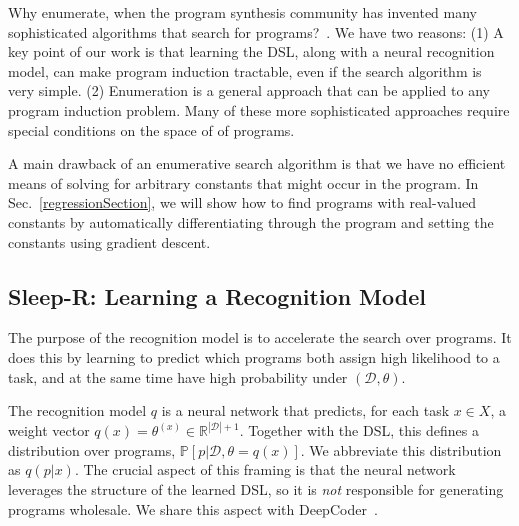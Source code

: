 \documentclass{article}
\newcommand{\probability}{\mathds{P}} %
\begin{document}
Why enumerate, when the program synthesis community has invented many
sophisticated algorithms that search for programs?~\cite{solar2008program,schkufza2013stochastic,feser2015synthesizing,osera2015type,polozov2015flashmeta}.
We have two reasons:
(1) A key point of our work is that learning the DSL, along with a neural recognition model, can make program induction tractable, even if the search algorithm is very simple.
(2) Enumeration is a general approach that can be applied to any program induction problem. Many of these more sophisticated approaches require special conditions on
  the space of of programs.

A main drawback of an enumerative search algorithm is that we have no
efficient means of solving for arbitrary constants that might occur in the
program. In Sec.~\ref{regressionSection},
we will show how to find programs with real-valued constants
by automatically differentiating through the program and setting the constants using gradient descent.







\subsection{Sleep-R: Learning a Recognition Model}\label{recognitionSection}

The purpose of the recognition model is to accelerate the search over
programs.  It does this by learning to predict which programs both 
assign high likelihood to a task, and at the same time 
have high probability under $(\mathcal{D},\theta)$.

The recognition model $q$ is a neural network that predicts,
for each task $x\in X$, a weight vector $q(x) = \theta^{(x)}\in \mathbb{R}^{|\mathcal{D}| + 1}$.
Together with the DSL, this defines a distribution over programs,
$\probability[p|\mathcal{D},\theta = q(x)]$.
We abbreviate this distribution as $q(p|x)$.
The crucial aspect of this framing is that the neural network
leverages the structure of the learned DSL,
so it is \emph{not} responsible for
generating programs wholesale.
We share this aspect with DeepCoder~\cite{balog2016deepcoder}.
\end{document}
